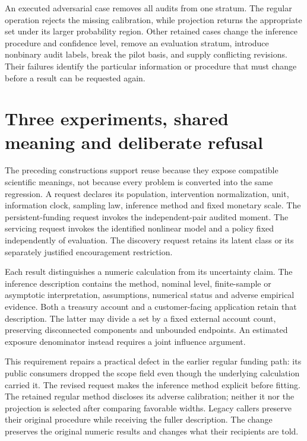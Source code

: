An executed adversarial case removes all audits from one stratum. The regular
operation rejects the missing calibration, while projection returns the
appropriate set under its larger probability region. Other retained cases
change the inference procedure and confidence level, remove an evaluation
stratum, introduce nonbinary audit labels, break the pilot basis, and supply
conflicting revisions. Their failures identify the particular information
or procedure that must change before a result can be requested again.


\section{Three experiments, shared meaning and deliberate refusal}
\label{c7:journeys}
The preceding constructions support reuse because they expose compatible
scientific meanings, not because every problem is converted into the same
regression. A request declares its population, intervention normalization,
unit, information clock, sampling law, inference method and fixed monetary
scale. The persistent-funding request invokes the independent-pair audited
moment. The servicing request invokes the identified nonlinear model and a
policy fixed independently of evaluation. The discovery request retains its
latent class or its separately justified encouragement restriction.

Each result distinguishes a numeric calculation from its uncertainty claim.
The inference description contains the method, nominal level, finite-sample
or asymptotic interpretation, assumptions, numerical status and adverse
empirical evidence. Both a treasury account and a customer-facing application
retain that description. The latter may divide a set by a fixed external
account count, preserving disconnected components and unbounded endpoints.
An estimated exposure denominator instead requires a joint influence argument.

This requirement repairs a practical defect in the earlier regular funding
path: its public consumers dropped the scope field even though the underlying
calculation carried it. The revised request makes the inference method explicit
before fitting. The retained regular method discloses its adverse calibration;
neither it nor the projection is selected after comparing favorable widths.
Legacy callers preserve their original procedure while receiving the fuller
description. The change preserves the original numeric results and changes
what their recipients are told.

